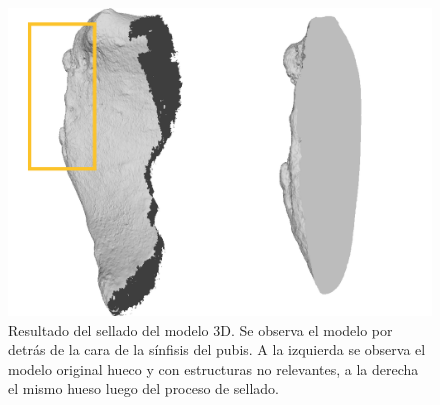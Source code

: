 \begin{figure}[h]
    \centering
    \includegraphics[width=\linewidth]{imagenes/planningAndImplementation/pre_postCut.png}
    \caption[Resultado del sellado del modelo 3D]{Resultado del sellado del modelo 3D. Se observa el modelo por detrás de la cara de la sínfisis del pubis. A la izquierda se observa el modelo original hueco y con estructuras no relevantes, a la derecha el mismo hueso luego del proceso de sellado.}
    \label{fig:boneBeforeAfter}
\end{figure}

